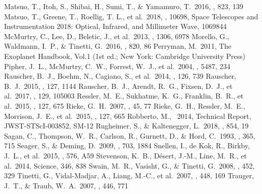 \documentclass{aastex62}
\begin{document}
\begin{thebibliography}{}
 Matsuo, T., Itoh, S., Shibai, H., Sumi, T., \& Yamamuro, T.\ 2016, \apj, 823, 139
 Matsuo, T., Greene, T., Roellig, T. L., et al.\ 2018, \procspie, 10698, Space Telescopes and Instrumentation 2018: Optical, Infrared, and Millimeter Wave, 1069844
 McMurtry, C., Lee, D., Beletic, J., et al.\ 2013, \procspie, 1306, 6978
 Morello, G., Waldmann, I.~P., \& Tinetti, G.\ 2016, \apj, 820, 86
 Perryman, M.\ 2011, The Exoplanet Handbook, Vol.1 (1st ed.; New York: Cambridge University Press)
 Pipher, J.~L., McMurtry, C.~W., Forrest, W.~J., et al.\ 2004, \procspie, 5487, 234
 Rauscher, B.~J., Boehm, N., Cagiano, S., et al.\ 2014, \pasp, 126, 739
 Rauscher, B.~J.\ 2015, \pasp, 127, 1144
 Rauscher, B.~J., Arendt, R.~G., Fixsen, D.~J., et al.\ 2017, \pasp, 129, 105003
 Ressler, M.~E., Sukhatme, K.~G., Franklin, B.~R., et al.\ 2015, \pasp, 127, 675
 Rieke, G.~H.\ 2007, \araa, 45, 77
 Rieke, G.~H., Ressler, M.~E., Morrison, J.~E., et al.\ 2015, \pasp, 127, 665
 Robberto, M., \ 2014, Technical Report, JWST-STScI-003852, SM-12
 Rugheimer, S., \& Kaltenegger, L.\ 2018, \apj, 854, 19
 Sagan, C., Thompson, W.~R., Carlson, R., Gurnett, D., \& Hord, C.\ 1993, \nat, 365, 715
 Seager, S., \& Deming, D.\ 2009, \apj, 703, 1884
 Snellen, I., de Kok, R., Birkby, J.~L., et al.\ 2015, \aap, 576, A59
 Stevenson, K.~B., D{\'e}sert, J.-M., Line, M.~R., et al.\ 2014, Science, 346, 838
 Swain, M.~R., Vasisht, G., \& Tinetti, G.\ 2008, \nat, 452, 329
 Tinetti, G., Vidal-Madjar, A., Liang, M.-C., et al.\ 2007, \nat, 448, 169
 Trauger, J.~T., \& Traub, W.~A.\ 2007, \nat, 446, 771

\end{thebibliography}
\end{document}
